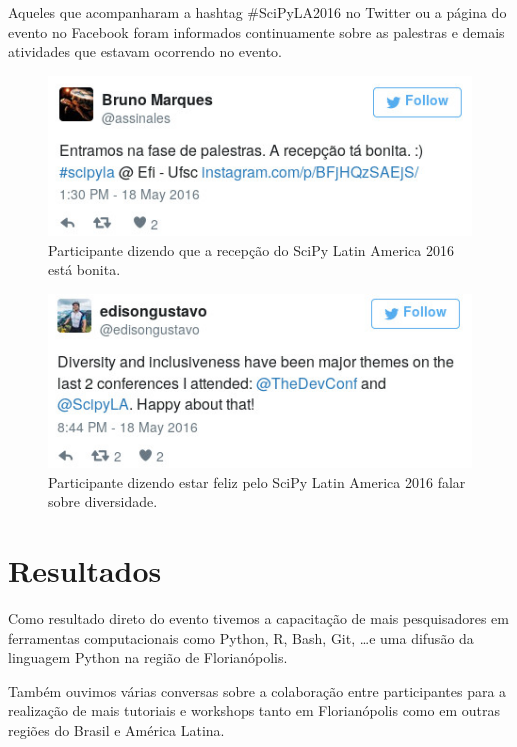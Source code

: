 \documentclass[12pt]{article}
\begin{document}
Aqueles que acompanharam a hashtag \#SciPyLA2016 no Twitter ou a página do
evento no Facebook foram informados continuamente sobre as palestras e demais
atividades que estavam ocorrendo no evento.

\begin{figure}[!htb]
\center
\includegraphics[height=.3\textheight]{tweet-recepcao.jpg}
\caption{Participante dizendo que a recepção do SciPy Latin America 2016 está
bonita.}
\end{figure}

\begin{figure}[!htb]
\center
\includegraphics[height=.3\textheight]{tweet-diversidade.jpg}
\caption{Participante dizendo estar feliz pelo SciPy Latin America 2016 falar
sobre diversidade.}
\end{figure}

\clearpage
\newpage

\section*{Resultados}

Como resultado direto do evento tivemos a capacitação de mais pesquisadores em
ferramentas computacionais como Python, R, Bash, Git, \ldots e uma difusão da
linguagem Python na região de Florianópolis.

Também ouvimos várias conversas sobre a colaboração entre participantes
para a realização de mais tutoriais e workshops tanto em Florianópolis
como em outras regiões do Brasil e América Latina.

\clearpage
\newpage
\end{document}

